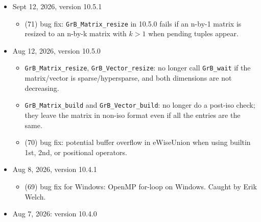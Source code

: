 \begin{itemize}
\item Sept 12, 2026, version 10.5.1

    \begin{itemize}
    \item (71) bug fix: \verb'GrB_Matrix_resize' in 10.5.0 fails if an n-by-1
        matrix is resized to an n-by-k matrix with $k>1$ when pending tuples
        appear.
    \end{itemize}

\item Aug 12, 2026, version 10.5.0

    \begin{itemize}
    \item \verb'GrB_Matrix_resize', \verb'GrB_Vector_resize': no longer call
        \verb'GrB_wait' if the matrix/vector is sparse/hypersparse, and both
        dimensions are not decreasing.
    \item \verb'GrB_Matrix_build' and \verb'GrB_Vector_build': no longer do a
        post-iso check; they leave the matrix in non-iso format even if all the
        entries are the same.
    \item (70) bug fix:  potential buffer overflow in eWiseUnion when using
        builtin 1st, 2nd, or positional operators.
    \end{itemize}

\item Aug 8, 2026, version 10.4.1

    \begin{itemize}
    \item (69) bug fix for Windows: OpenMP for-loop on Windows.
        Caught by Erik Welch.
    \end{itemize}

\item Aug 7, 2026: version 10.4.0


\end{itemize}
